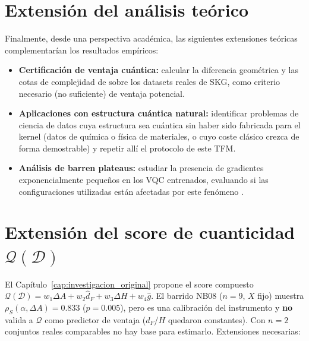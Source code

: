 \section{Extensión del análisis teórico}

Finalmente, desde una perspectiva académica, las siguientes extensiones teóricas complementarían los resultados empíricos:

\begin{itemize}
    \item \textbf{Certificación de ventaja cuántica:} calcular la diferencia geométrica y las cotas de complejidad de \cite{huang2021} sobre los datasets reales de SKG, como criterio necesario (no suficiente) de ventaja potencial.
    \item \textbf{Aplicaciones con estructura cuántica natural:} identificar problemas de ciencia de datos cuya estructura sea cuántica sin haber sido fabricada para el kernel (datos de química o física de materiales, o cuyo coste clásico crezca de forma demostrable) y repetir allí el protocolo de este TFM.
    \item \textbf{Análisis de barren plateaus:} estudiar la presencia de gradientes exponencialmente pequeños en los VQC entrenados, evaluando si las configuraciones utilizadas están afectadas por este fenómeno \citep{cerezo2023}.
\end{itemize}

\section[Extensión del score de cuanticidad]{Extensión del score de cuanticidad $\mathcal{Q}(\mathcal{D})$}

El Capítulo~\ref{cap:investigacion_original} propone el score compuesto $\mathcal{Q}(\mathcal{D}) = w_1 \Delta A + w_2 \hat{d}_F + w_3 \Delta H + w_4 \hat{g}$. El barrido NB08 ($n=9$, $X$ fijo) muestra $\rho_S(\alpha,\Delta A)=0.833$ ($p=0.005$), pero es una calibración del instrumento y \textbf{no} valida a $\mathcal{Q}$ como predictor de ventaja ($d_F$/$H$ quedaron constantes). Con $n=2$ conjuntos reales comparables no hay base para estimarlo. Extensiones necesarias:

